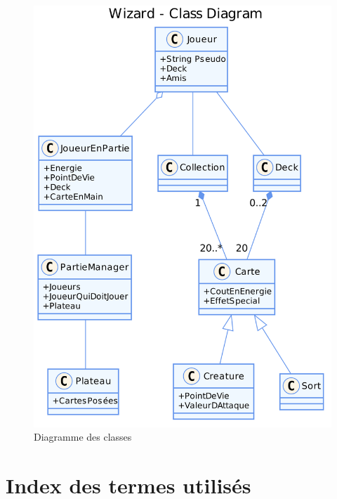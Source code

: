 \documentclass[11pt,a4paper]{article}
\begin{document}
\begin{figure}[ht]
  \centering
  \includegraphics[width=1\textwidth]{uml_files/ClassDiagram.png}
  \caption{\label{fig:class} Diagramme des classes}
\end{figure}


\appendix

\section{Index des termes utilisés}
\label{sec:index}
\end{document}
